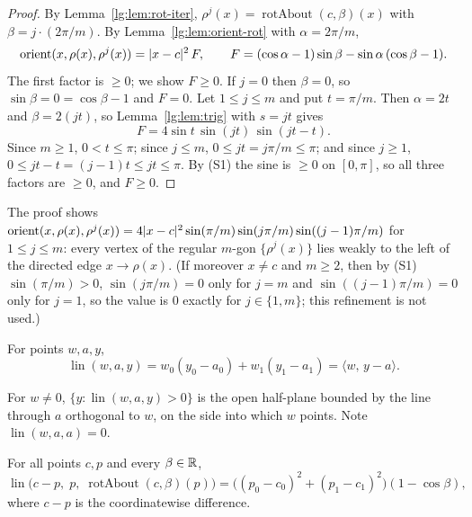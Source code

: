 \begin{proof}
By Lemma~\ref{lg:lem:rot-iter}, $\rho^{j}(x)=\operatorname{rotAbout}(c,\beta)(x)$ with $\beta=j\cdot(2\pi/m)$. By
Lemma~\ref{lg:lem:orient-rot} with $\alpha=2\pi/m$,
\[
  \operatorname{orient}(x,\rho(x),\rho^{j}(x))=\lvert x-c\rvert^2\,F,\qquad F=(\cos\alpha-1)\sin\beta-\sin\alpha\,(\cos\beta-1).
\]
The first factor is $\ge0$; we show $F\ge0$. If $j=0$ then $\beta=0$, so $\sin\beta=0=\cos\beta-1$ and $F=0$. Let
$1\le j\le m$ and put $t=\pi/m$. Then $\alpha=2t$ and $\beta=2(jt)$, so Lemma~\ref{lg:lem:trig} with $s=jt$ gives
\[
  F=4\sin t\,\sin(jt)\,\sin(jt-t).
\]
Since $m\ge1$, $0<t\le\pi$; since $j\le m$, $0\le jt=j\pi/m\le\pi$; and since $j\ge1$, $0\le jt-t=(j-1)t\le jt\le\pi$.
By (S1) the sine is $\ge0$ on $[0,\pi]$, so all three factors are $\ge0$, and $F\ge0$.
\end{proof}

\begin{remark}
The proof shows $\operatorname{orient}(x,\rho(x),\rho^{j}(x))=4\lvert x-c\rvert^2\sin(\pi/m)\sin(j\pi/m)\sin((j-1)\pi/m)$ for
$1\le j\le m$: every vertex of the regular $m$-gon $\{\rho^{j}(x)\}$ lies weakly to the left of the directed edge
$x\to\rho(x)$. (If moreover $x\ne c$ and $m\ge2$, then by (S1) $\sin(\pi/m)>0$, $\sin(j\pi/m)=0$ only for $j=m$ and
$\sin((j-1)\pi/m)=0$ only for $j=1$, so the value is $0$ exactly for $j\in\{1,m\}$; this refinement is not used.)
\end{remark}

\begin{definition}\label{lg:def:lin}
For points $w,a,y$,
\[
  \operatorname{lin}(w,a,y)=w_0(y_0-a_0)+w_1(y_1-a_1)=\langle w,\,y-a\rangle .
\]
\end{definition}

For $w\ne0$, $\{y:\operatorname{lin}(w,a,y)>0\}$ is the open half-plane bounded by the line through $a$ orthogonal to
$w$, on the side into which $w$ points. Note $\operatorname{lin}(w,a,a)=0$.

\begin{lemma}\label{lg:lem:lin-rot}
For all points $c,p$ and every $\beta\in\mathbb R$,
\[
  \operatorname{lin}\bigl(c-p,\;p,\;\operatorname{rotAbout}(c,\beta)(p)\bigr)=\bigl((p_0-c_0)^2+(p_1-c_1)^2\bigr)(1-\cos\beta),
\]
where $c-p$ is the coordinatewise difference.
\end{lemma}

